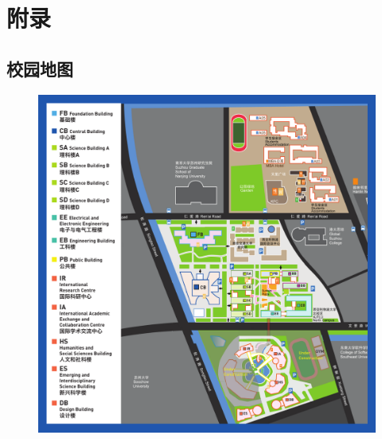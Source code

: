 \chapter{附录}
\label{sec.appendix}

\section{校园地图}
\begin{figure}[H]
    \includegraphics[width=\columnwidth]{author-folder/Kai.Wu/XJTLU-campus-map.pdf}
\end{figure}

\clearpage
